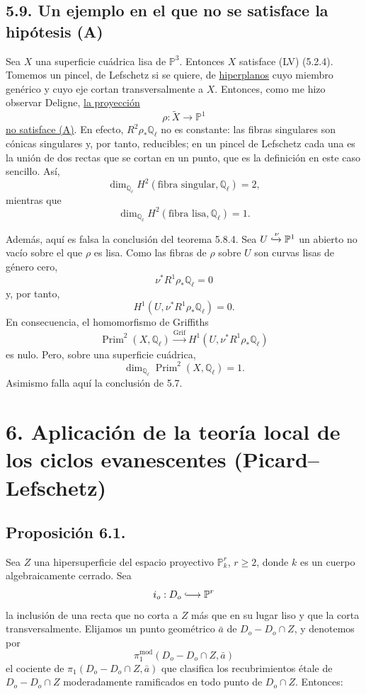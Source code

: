 \pageoriginale

\subsection*{5.9. Un ejemplo en el que no se satisface la hipótesis (A)}

Sea $X$ una superficie cuádrica lisa de $\mathbb P^3$. Entonces $X$
satisface (LV) (5.2.4). Tomemos un pincel, de Lefschetz si se quiere,
de \underline{hiperplanos} cuyo miembro genérico y cuyo eje cortan
transversalmente a $X$. Entonces, como me hizo observar Deligne,
\underline{la proyección}
\[
\rho:\widetilde X\longrightarrow\mathbb P^1
\]
\underline{no satisface (A)}. En efecto, $R^2\rho_*\mathbb Q_\ell$ no
es constante: las fibras singulares son cónicas singulares y, por
tanto, reducibles; en un pincel de Lefschetz cada una es la unión de
dos rectas que se cortan en un punto, que es la definición en este
caso sencillo. Así,
\[
\dim_{\mathbb Q_\ell}H^2(\text{fibra singular},\mathbb Q_\ell)=2,
\]
mientras que
\[
\dim_{\mathbb Q_\ell}H^2(\text{fibra lisa},\mathbb Q_\ell)=1.
\]

Además, aquí es falsa la conclusión del teorema 5.8.4. Sea
$U\xhookrightarrow{\nu}\mathbb P^1$ un abierto no vacío sobre el que
$\rho$ es lisa. Como las fibras de $\rho$ sobre $U$ son curvas lisas de
género cero,
\[
\nu^*R^1\rho_*\mathbb Q_\ell=0
\]
y, por tanto,
\[
H^1(U,\nu^*R^1\rho_*\mathbb Q_\ell)=0.
\]
En consecuencia, el homomorfismo de Griffiths
\[
\operatorname{Prim}^2(X,\mathbb Q_\ell)
\xrightarrow{\operatorname{Grif}}
H^1(U,\nu^*R^1\rho_*\mathbb Q_\ell)
\]
es nulo. Pero, sobre una superficie cuádrica,
\[
\dim_{\mathbb Q_\ell}\operatorname{Prim}^2(X,\mathbb Q_\ell)=1.
\]
Asimismo falla aquí la conclusión de 5.7.

\pageoriginale

\section*[6. Ciclos evanescentes (Picard--Lefschetz)]{\texorpdfstring{6. Aplicación de la teoría local de los ciclos evanescentes
(Picard--Lefschetz)}{6. Aplicación de la teoría local de los ciclos evanescentes (Picard--Lefschetz)}}

\subsection*{Proposición 6.1.}

Sea $Z$ una hipersuperficie del espacio proyectivo $\mathbb P^r_k$,
$r\geq2$, donde $k$ es un cuerpo algebraicamente cerrado. Sea
\[
i_o:D_o\lhook\joinrel\longrightarrow\mathbb P^r
\]
la inclusión de una recta que no corta a $Z$ más que en su lugar liso
y que la corta transversalmente. Elijamos un punto geométrico $\bar a$
de $D_o-D_o\cap Z$, y denotemos por
\[
\pi_1^{\mathrm{mod}}(D_o-D_o\cap Z,\bar a)
\]
el cociente de $\pi_1(D_o-D_o\cap Z,\bar a)$ que clasifica los
recubrimientos étale de $D_o-D_o\cap Z$ moderadamente ramificados en
todo punto de $D_o\cap Z$. Entonces:

